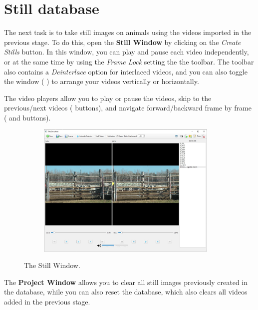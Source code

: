 \documentclass[10pt,a4paper,oneside]{report}             %
\newcommand*{\img}[1]{%
	\raisebox{-.02\baselineskip}{%
		\texttt{[image: \#1]}%
	}%
}
\begin{document}
\section{Still database}

The next task is to take still images on animals using the videos imported in the previous stage. To do this, open the \textbf{Still Window} by clicking on the \textit{Create Stills} button. In this window, you can play and pause each video independently, or at the same time by using the \textit{Frame Lock} setting the the toolbar. The toolbar also contains a \textit{Deinterlace} option for interlaced videos, and you can also toggle the window (\img{../VAM/Icons/if_tile_windows_horizontally_16x16_10026.png}) to arrange your videos vertically or horizontally.

The video players allow you to play or pause the videos, skip to the previous/next videos (\img{../VAM/Icons/1462036208_Skip-Backward.png} \img{../VAM/Icons/1462036208_Skip-Forward.png} buttons), and navigate forward/backward frame by frame (\img{../VAM/Icons/1462036188_Fast-Backward.png} and \img{../VAM/Icons/1462036188_Fast-Forward.png} buttons).

\begin{figure}[H]
	\centering
	\begin{subfigure}{\textwidth}
		\centering 
		\includegraphics[width=0.95\textwidth]{./images/VideoW.jpg}
	\end{subfigure}
	\caption[]
	{\small  The Still Window.}
\end{figure} 

The \textbf{Project Window} allows you to clear all still images previously created in the database, while you can also reset the database, which also clears all videos added in the previous stage.
\end{document}
